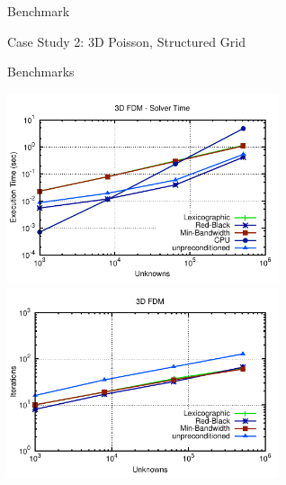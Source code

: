 \begin{frame}{Benchmark}
 \begin{center}
  Case Study 2: 3D Poisson, Structured Grid
 \end{center}
\end{frame}

\begin{frame}{Benchmarks}
  \begin{center}
   \vspace*{-0.4cm}
   \includegraphics[width=0.6\textwidth]{figures/fdm3d-solver.pdf} \\[-0.2em]
   \includegraphics[width=0.6\textwidth]{figures/fdm3d-iters.pdf}
  \end{center}
\end{frame}

